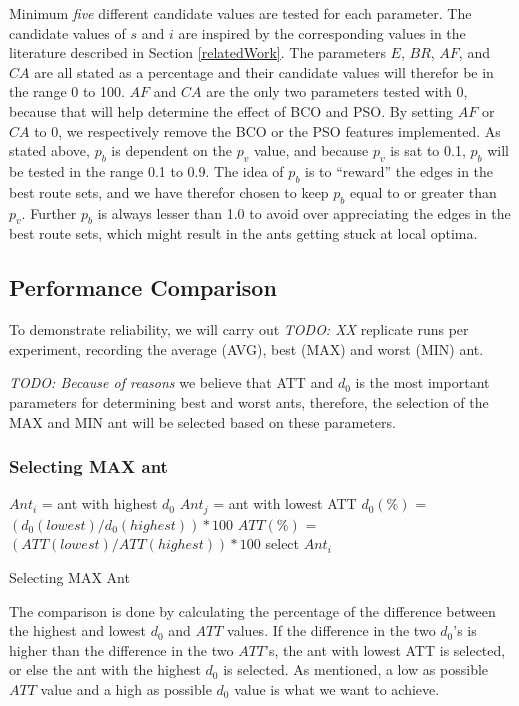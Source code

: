 Minimum \textit{five} different candidate values are tested for each parameter. The candidate values of $s$ and $i$ are inspired by the corresponding values in the literature described in Section \vref{relatedWork}. The parameters $E$, $BR$, $AF$, and $CA$ are all stated as a percentage and their candidate values will therefor be in the range 0 to 100. $AF$ and $CA$ are the only two parameters tested with 0, because that will help determine the effect of BCO and PSO. By setting $AF$ or $CA$ to 0, we respectively remove the BCO or the PSO features implemented. As stated above, $p_b$ is dependent on the $p_v$ value, and because $p_v$ is sat to 0.1, $p_b$ will be tested in the range 0.1 to 0.9. The idea of $p_b$ is to ``reward'' the edges in the best route sets, and we have therefor chosen to keep $p_b$ equal to or greater than $p_v$. Further $p_b$ is always lesser than 1.0 to avoid over appreciating the edges in the best route sets, which might result in the ants getting stuck at local optima. 
\subsection{Performance Comparison}

To demonstrate reliability, we will carry out \emph{\color{blue} TODO: XX } replicate runs per experiment, recording the average (AVG), best (MAX) and worst (MIN) ant.  

\emph{\color{blue} TODO: Because of reasons }we believe that ATT and $d_0$ is the most important parameters for determining best and worst ants, therefore, the selection of the MAX and MIN ant will be selected based on these parameters. 

\subsubsection{Selecting MAX ant}
\begin{algorithm}[H]
$Ant_{i}$ = ant with highest $d_0$\;
$Ant_{j}$ = ant with lowest ATT\;
{
	$d_0(\%)$ = $(d_0(lowest) / d_0(highest))*100$\;
	$ATT(\%)$ = $(ATT(lowest) / ATT(highest))*100$\;
	{
		select $Ant_{i}$
	}
}
 \caption{Selecting MAX Ant}
\end{algorithm}


The comparison is done by calculating the percentage of the difference between the highest and lowest $d_0$ and $ATT$ values. If the difference in the two $d_0$'s is higher than the difference in the two $ATT$'s, the ant with lowest ATT is selected, or else the ant with the highest $d_0$ is selected. As mentioned, a low as possible $ATT$ value and a high as possible $d_0$ value is what we want to achieve.

